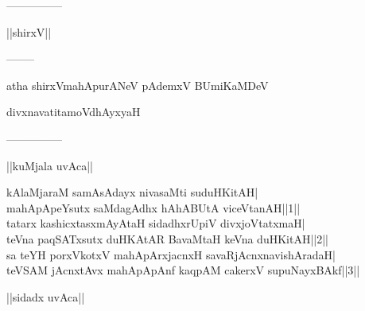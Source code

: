 \documentclass{article}
\begin{document}
\begin{center}
---------------
\end{center}

\begin{center}
||shirxV||
\end{center}

\begin{center}
--------
\end{center}

\begin{center}
atha shirxVmahApurANeV pAdemxV BUmiKaMDeV
\end{center}

\begin{center}
divxnavatitamoVdhAyxyaH
\end{center}

\begin{center}
---------------
\end{center}

\begin{center}
||kuMjala uvAca||
\end{center}

kAlaMjaraM samAsAdayx nivasaMti suduHKitAH|\\
mahApApeYsutx saMdagAdhx hAhABUtA viceVtanAH||1||\\
tatarx kashicxtasxmAyAtaH sidadhxrUpiV divxjoVtatxmaH|\\
teVna paqSATxsutx duHKAtAR BavaMtaH keVna duHKitAH||2||\\
sa teYH porxVkotxV mahApArxjacnxH savaRjAcnxnavishAradaH|\\
teVSAM jAcnxtAvx mahApApAnf kaqpAM cakerxV supuNayxBAkf||3||\\

\begin{center}
||sidadx uvAca||
\end{center}
\end{document}
